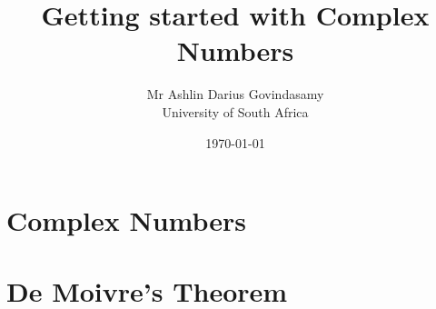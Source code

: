 \documentclass{report}
\title{Getting started with Complex Numbers}
\author{Mr Ashlin Darius Govindasamy\\ \large{University of South Africa}}
\date{\today}
\begin{document}
\maketitle
\newpage

\tableofcontents

\chapter{Complex Numbers}


\chapter{De Moivre's Theorem}


\newpage
\end{document}

